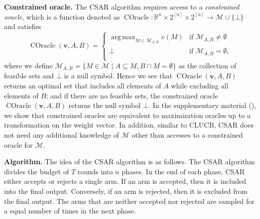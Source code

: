 \documentclass{article}
\newcommand{\junk}[1]{}
\newcommand{\Algorithm}{{\small \textsf{CLUCB}}\xspace}
\newcommand{\AlgorithmBud}{{\small \textsf{CSAR}}\xspace}
\newcommand{\M}{\mathcal M}
\newcommand{\RR}{\mathbb R}
\DeclareMathOperator*{\argmax}{arg\,max}
\DeclareMathOperator{\COracle}{COracle}
\renewcommand{\vec}[1]{\boldsymbol{#1}}
\begin{document}
\textbf{Constrained oracle.} 
The \AlgorithmBud algorithm requires access to a \emph{constrained oracle}, which is a function denoted as $\COracle: \RR^{n}\times 2^{[n]} \times 2^{[n]} \rightarrow \M \cup \{\bot\}$ and satisfies
\begin{equation}
\label{eq:coracle-def}
\COracle(\vec v, A, B)=
\begin{cases} 
	\argmax_{M\in \M_{A,B}} v(M) & \text{if } \M_{A,B} \not= \emptyset\\
	\bot & \text{if }\M_{A,B} = \emptyset,\\
\end{cases}
\end{equation}
where we define $\M_{A,B}=\{M\in \M \mid A\subseteq M, B\cap M = \emptyset\}$ as the collection of feasible sets and $\bot$ is a null symbol.
Hence we see that $\COracle(\vec v, A, B)$ returns an optimal set that includes all elements of $A$ while excluding all elements of $B$; and if there are no feasible sets, the constrained oracle $\COracle(\vec v, A, B)$ returns the null symbol $\bot$.
In the supplementary material (), we show that constrained oracles are equivalent to maximization oracles up to a transformation on the weight vector.
In addition, similar to \Algorithm, \AlgorithmBud does not need any additional knowledge of $\M$ other than accesses to a constrained oracle for $\M$.


\textbf{Algorithm.}
The idea of the \AlgorithmBud algorithm is as follows.
The \AlgorithmBud algorithm divides the budget of $T$ rounds into $n$ phases. 
In the end of each phase, \AlgorithmBud either accepts or rejects a single arm. 
If an arm is accepted, then it is included into the final output. 
Conversely, if an arm is rejected, then it is excluded from the final output.
The arms that are neither accepted nor rejected are sampled for a equal number of times in the next phase.
\junk{We see that the major challenge here is to choose a correct arm to accept/reject. 
For decision classes with non-trivial combinatorial structures, one cannot simply accept/reject arms according to their empirical means, since an arm with small expected reward may belong to the optimal set.
We resolve this challenge by using a novel gap estimation method for decision making and demonstrate that \AlgorithmBud can achieve a small probability of error.}
\end{document}
